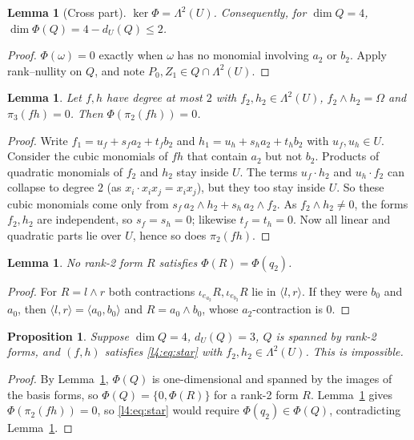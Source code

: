 \documentclass[11pt,a4paper]{article}
\theoremstyle{plain}
\newtheorem{lemma}[theorem]{Lemma}
\newtheorem{proposition}[theorem]{Proposition}
\theoremstyle{remark}
\newcommand{\Lam}{\Lambda^2}
\newcommand{\dU}{d_U}
\begin{document}
\begin{lemma}[Cross part]\label{l4:lem:cross}
$\ker\Phi=\Lam(U)$. Consequently, for $\dim Q=4$, $\dim\Phi(Q)=4-\dU(Q)\le 2$.
\end{lemma}

\begin{proof}
$\Phi(\omega)=0$ exactly when $\omega$ has no monomial involving $a_2$ or $b_2$. Apply rank--nullity on $Q$, and note $P_0,Z_1\in Q\cap\Lam(U)$.
\end{proof}

\begin{lemma}\label{l4:lem:planeU}
Let $f,h$ have degree at most $2$ with $f_2,h_2\in\Lam(U)$, $f_2\wedge h_2=\Omega$ and $\pi_3(fh)=0$. Then $\Phi(\pi_2(fh))=0$.
\end{lemma}

\begin{proof}
Write $f_1=u_f+s_fa_2+t_fb_2$ and $h_1=u_h+s_ha_2+t_hb_2$ with $u_f,u_h\in U$. Consider the cubic monomials of $fh$ that contain $a_2$ but not $b_2$. Products of quadratic monomials of $f_2$ and $h_2$ stay inside $U$. The terms $u_f\cdot h_2$ and $u_h\cdot f_2$ can collapse to degree $2$ (as $x_i\cdot x_ix_j=x_ix_j$), but they too stay inside $U$. So these cubic monomials come only from $s_f\,a_2\wedge h_2+s_h\,a_2\wedge f_2$. As $f_2\wedge h_2\ne0$, the forms $f_2,h_2$ are independent, so $s_f=s_h=0$; likewise $t_f=t_h=0$. Now all linear and quadratic parts lie over $U$, hence so does $\pi_2(fh)$.
\end{proof}

\begin{lemma}\label{l4:lem:noq2}
No rank-2 form $R$ satisfies $\Phi(R)=\Phi(q_2)$.
\end{lemma}

\begin{proof}
For $R=l\wedge r$ both contractions $\iota_{e_{a_2}}R,\iota_{e_{b_2}}R$ lie in $\langle l,r\rangle$. If they were $b_0$ and $a_0$, then $\langle l,r\rangle=\langle a_0,b_0\rangle$ and $R=a_0\wedge b_0$, whose $a_2$-contraction is $0$.
\end{proof}

\begin{proposition}\label{l4:prop:B}
Suppose $\dim Q=4$, $\dU(Q)=3$, $Q$ is spanned by rank-2 forms, and $(f,h)$ satisfies \eqref{l4:eq:star} with $f_2,h_2\in\Lam(U)$. This is impossible.
\end{proposition}

\begin{proof}
By Lemma~\ref{l4:lem:cross}, $\Phi(Q)$ is one-dimensional and spanned by the images of the basis forms, so $\Phi(Q)=\{0,\Phi(R)\}$ for a rank-2 form $R$. Lemma~\ref{l4:lem:planeU} gives $\Phi(\pi_2(fh))=0$, so \eqref{l4:eq:star} would require $\Phi(q_2)\in\Phi(Q)$, contradicting Lemma~\ref{l4:lem:noq2}.
\end{proof}
\end{document}
